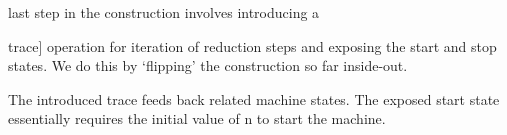 \documentclass{llncs}
\begin{document}
last step in the construction involves introducing a {{trace}]
operation for iteration of reduction steps and exposing the start and
stop states. We do this by `flipping' the construction so far
inside-out.

\vspace{-20px}
\begin{multicols}{2}
\begin{center}
\end{center}
\columnbreak
\begin{center}
\end{center}  
\end{multicols}

The introduced {{trace}} feeds back related machine states. The
exposed start state essentially requires the initial value of {{n}} to
start the machine. 

\begin{center}
\end{center}



}
\end{document}

